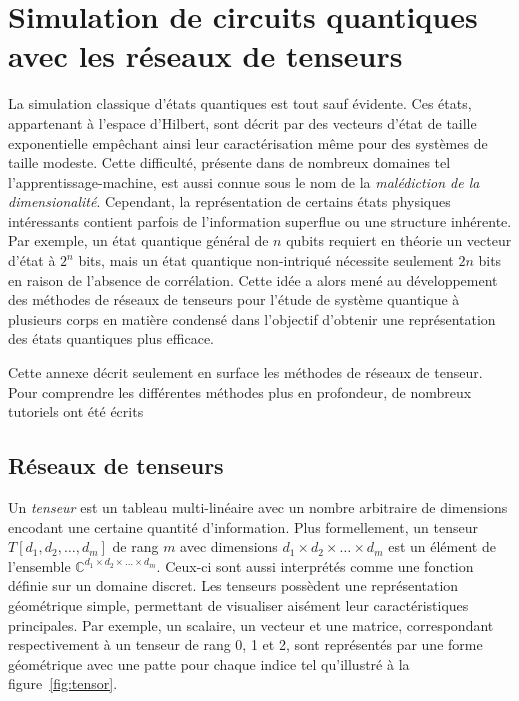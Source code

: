 \chapter{Simulation de circuits quantiques avec les réseaux de tenseurs}
\label{ann:simulation-circuits-quantiques-avec-reseaux-de-tenseurs}

La simulation classique d'états quantiques est tout sauf évidente. Ces états, appartenant à l'espace d'Hilbert, sont décrit par des vecteurs d'état de taille exponentielle empêchant ainsi leur caractérisation même pour des systèmes de taille modeste. Cette difficulté, présente dans de nombreux domaines tel l'apprentissage-machine, est aussi connue sous le nom de la \textit{malédiction de la dimensionalité}. Cependant, la représentation de certains états physiques intéressants contient parfois de l'information superflue ou une structure inhérente. Par exemple, un état quantique général de $n$ qubits requiert en théorie un vecteur d'état à $2^{n}$ bits, mais un état quantique non-intriqué nécessite seulement $2n$ bits en raison de l'absence de corrélation. Cette idée a alors mené au développement des méthodes de réseaux de tenseurs pour l'étude de système quantique à plusieurs corps en matière condensé dans l'objectif d'obtenir une représentation des états quantiques plus efficace. 

Cette annexe décrit seulement en surface les méthodes de réseaux de tenseur. Pour comprendre les différentes méthodes plus en profondeur, de nombreux tutoriels ont été écrits~\cite{bridgemanHandwavingInterpretiveDance2017,biamonteTensorNetworksNutshell2017,bakerMethodesCalculAvec2021}


\section{Réseaux de tenseurs}


Un \textit{tenseur} est un tableau multi-linéaire avec un nombre arbitraire de dimensions encodant une certaine quantité d'information. Plus formellement, un tenseur $T[d_{1}, d_{2}, \dots, d_{m}]$ de rang $m$ avec dimensions $d_{1} \times d_{2} \times \dots \times d_{m}$ est un élément de l'ensemble $\mathbb{C}^{d_{1} \times d_{2} \times \dots \times d_{m}}$. Ceux-ci sont aussi interprétés comme une fonction définie sur un domaine discret. Les tenseurs possèdent une représentation géométrique simple, permettant de visualiser aisément leur caractéristiques principales. Par exemple, un scalaire, un vecteur et une matrice, correspondant respectivement à un tenseur de rang 0, 1 et 2, sont représentés par une forme géométrique avec une patte pour chaque indice tel qu'illustré à la figure~\ref{fig:tensor}.

